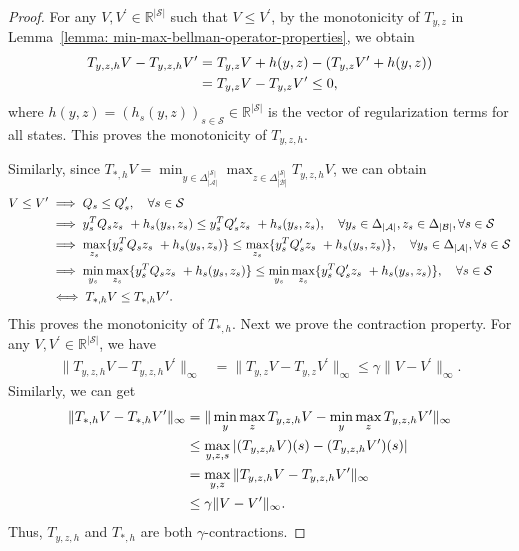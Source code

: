 \documentclass{article}
\theoremstyle{plain}
\theoremstyle{definition}
\theoremstyle{remark}
\def\R{\mathbb R}
\def\cA{\mathcal A}
\def\cB{\mathcal B}
\def\cS{\mathcal S}
\begin{document}
\begin{proof}
    For any $V, V^\prime \in \mathbb{R}^{|\mathcal{S}|}$ such that $V \le V^\prime$, by the monotonicity of $T_{y,z}$ in Lemma~\ref{lemma: min-max-bellman-operator-properties}, we obtain
    \begin{align}
        T_{y,z,h} V - T_{y,z,h} V^\prime & = T_{y,z} V + h(y,z) - (T_{y,z} V^\prime + h(y,z)) \notag\\
        & = T_{y,z} V - T_{y,z} V^\prime \le 0,
    \end{align}
    where $h(y,z) = \left(h_s(y,z)\right)_{s\in\cS} \in \R^{|\cS|}$ is the vector of regularization terms for all states. This proves the monotonicity of $T_{y,z,h}$.

    Similarly, since $T_{*,h} V = \min_{y \in \Delta_{|\cA|}^{|\mathcal{S}|}} \max_{z \in \Delta_{|\cB|}^{|\mathcal{S}|}} T_{y,z,h} V$, we can obtain
    \begin{align}
         V \le V^\prime 
        & \implies Q_s \le Q_s^\prime , \quad \forall s\in \mathcal{S}\notag \\
        & \implies y_s^T Q_s z_s \ +h_s(y_s,z_s) \le y_s^T Q_s^\prime z_s \ +h_s(y_s,z_s) , \quad \forall y_s \in \Delta_{|\cA|}, z_s \in \Delta_{|\cB|}, \forall s\in \mathcal{S}\notag \\
        & \implies \max_{z_s} \{ y_s^T Q_s z_s \ +h_s(y_s,z_s) \} \le \max_{z_s} \{ y_s^T Q_s^\prime z_s \ +h_s(y_s,z_s) \}, \quad \forall y_s \in \Delta_{|\cA|}, \forall s\in \mathcal{S}\notag \\   
        & \implies \min_{y_s} \max_{z_s} \{ y_s^T Q_s z_s \ +h_s(y_s,z_s) \} \le \min_{y_s} \max_{z_s} \{ y_s^T Q_s^\prime z_s \ +h_s(y_s,z_s) \} , \quad \forall s\in \mathcal{S} \notag\\
        & \iff T_{*,h} V \le T_{*,h} V^\prime.
    \end{align}
    This proves the monotonicity of $T_{*,h}$. 
    Next we prove the contraction property.
    For any $V, V^\prime \in \mathbb{R}^{|\mathcal{S}|}$, we have
    \begin{align}
        \|T_{y,z,h} V - T_{y,z,h} V^\prime\|_\infty & = \| T_{y,z} V - T_{y,z} V^\prime \|_\infty  \le \gamma \| V - V^\prime \|_\infty.
    \end{align}
    Similarly, we can get
    \begin{align}
        \|T_{*,h} V - T_{*,h} V^\prime\|_\infty & = \| \min_{y} \max_{z} T_{y,z,h} V - \min_{y} \max_{z} T_{y,z,h} V^\prime \|_\infty \notag\\
        & \le \max_{y,z,s} | (T_{y,z,h} V)(s) - (T_{y,z,h} V^\prime)(s) |\notag \\
        & = \max_{y,z} \| T_{y,z,h} V - T_{y,z,h} V^\prime \|_\infty \notag\\
        & \le \gamma \| V - V^\prime \|_\infty.
    \end{align}
    Thus, $T_{y,z,h}$ and $T_{*,h}$ are both $\gamma$-contractions.


\end{proof}
\end{document}
